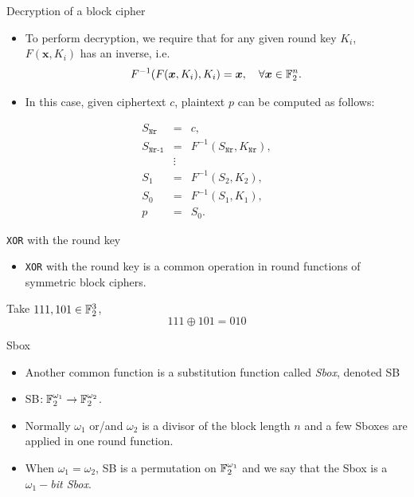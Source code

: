 \begin{frame}{Decryption of a block cipher}
    \begin{itemize}
        \item To perform decryption, we require that for any given round key $K_i$, $F(\boldsymbol{x}, K_i)$ has an inverse, i.e.
\[
F^{-1}(F(\boldsymbol{x},K_i),K_i)=\boldsymbol{x},\quad \forall \boldsymbol{x}\in{\mathbb F}_2^n.
\]
\item In this case, given ciphertext $c$, plaintext $p$ can be computed as follows:
\end{itemize}
\begin{eqnarray*}
S_{\texttt{Nr}} &=& c,\\
S_{\texttt{Nr-1}} &=& F^{-1}(S_{\texttt{Nr}},K_{\texttt{Nr}}),\\
&\vdots&\\
S_1 &=& F^{-1}(S_2,K_2),\\
S_0 &=& F^{-1}(S_1,K_1),\\
p &=& S_0.
\end{eqnarray*}
\end{frame}

\begin{frame}{\texttt{XOR} with the round key}
    \begin{itemize}
        \item \texttt{XOR} with the round key is a common operation in round functions of symmetric block ciphers.
    \end{itemize}
    \begin{example}
Take $111,101\in{\mathbb F}_2^3$, 
\[
111\oplus 101=010
\]
    \end{example}
\end{frame}

\begin{frame}{Sbox}
    \begin{itemize}
        \item Another common function is a substitution function called \textit{Sbox}, denoted SB
        \item SB$:{\mathbb F}_2^{\omega_1}\to{\mathbb F}_2^{\omega_2}$.
        \item Normally $\omega_1$ or/and $\omega_2$ is a divisor of the block length $n$ and a few Sboxes are applied in one round function.
        \item When $\omega_1=\omega_2$, SB is a permutation on ${\mathbb F}_2^{\omega_1}$ and we say that the Sbox is a \textit{$\omega_1-$bit Sbox}.
    \end{itemize}
\end{frame}

